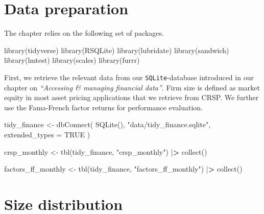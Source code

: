 \documentclass[
]{book}
\newenvironment{Shaded}{\begin{snugshade}}{\end{snugshade}}
\newcommand{\AttributeTok}[1]{\textcolor[rgb]{0.61,0.61,0.61}{#1}}
\newcommand{\ConstantTok}[1]{\textcolor[rgb]{0,0,0}{#1}}
\newcommand{\ErrorTok}[1]{\textcolor[rgb]{0.14,0.14,0.14}{\textbf{#1}}}
\newcommand{\FunctionTok}[1]{\textcolor[rgb]{0,0,0}{#1}}
\newcommand{\NormalTok}[1]{#1}
\newcommand{\OtherTok}[1]{\textcolor[rgb]{0.37,0.37,0.37}{#1}}
\newcommand{\SpecialCharTok}[1]{\textcolor[rgb]{0,0,0}{#1}}
\newcommand{\StringTok}[1]{\textcolor[rgb]{0.5,0.5,0.5}{#1}}
\begin{document}
\hypertarget{data-preparation-1}{%
\section{Data preparation}\label{data-preparation-1}}

The chapter relies on the following set of packages.

\begin{Shaded}
\begin{Highlighting}[]
\FunctionTok{library}\NormalTok{(tidyverse)}
\FunctionTok{library}\NormalTok{(RSQLite)}
\FunctionTok{library}\NormalTok{(lubridate)}
\FunctionTok{library}\NormalTok{(sandwich)}
\FunctionTok{library}\NormalTok{(lmtest)}
\FunctionTok{library}\NormalTok{(scales)}
\FunctionTok{library}\NormalTok{(furrr)}
\end{Highlighting}
\end{Shaded}

First, we retrieve the relevant data from our \texttt{SQLite}-database introduced in our chapter on \emph{``Accessing \& managing financial data''}. Firm size is defined as market equity in most asset pricing applications that we retrieve from CRSP. We further use the Fama-French factor returns for performance evaluation.

\begin{Shaded}
\begin{Highlighting}[]
\NormalTok{tidy\_finance }\OtherTok{\textless{}{-}} \FunctionTok{dbConnect}\NormalTok{(}
  \FunctionTok{SQLite}\NormalTok{(), }\StringTok{"data/tidy\_finance.sqlite"}\NormalTok{, }\AttributeTok{extended\_types =} \ConstantTok{TRUE}
\NormalTok{)}

\NormalTok{crsp\_monthly }\OtherTok{\textless{}{-}} \FunctionTok{tbl}\NormalTok{(tidy\_finance, }\StringTok{"crsp\_monthly"}\NormalTok{) }\SpecialCharTok{|}\ErrorTok{\textgreater{}}
  \FunctionTok{collect}\NormalTok{()}

\NormalTok{factors\_ff\_monthly }\OtherTok{\textless{}{-}} \FunctionTok{tbl}\NormalTok{(tidy\_finance, }\StringTok{"factors\_ff\_monthly"}\NormalTok{) }\SpecialCharTok{|}\ErrorTok{\textgreater{}}
  \FunctionTok{collect}\NormalTok{()}
\end{Highlighting}
\end{Shaded}

\hypertarget{size-distribution}{%
\section{Size distribution}\label{size-distribution}}
\end{document}
